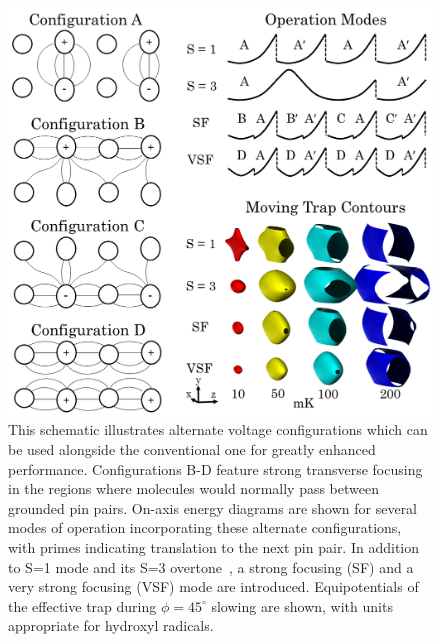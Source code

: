 \documentclass[%
 reprint,
 amsmath,amssymb,
 aps,
prl,
]{revtex4-1}
\newcommand{\SO}{{S=1 }}
\newcommand{\ST}{{S=3 }}
\begin{document}
\begin{figure}[ht!]
\includegraphics[width=\linewidth]{chargecartoon.png}%
\caption{
This schematic illustrates alternate voltage configurations which can be used alongside the conventional one for greatly enhanced performance. Configurations B-D feature strong transverse focusing in the regions where molecules would normally pass between grounded pin pairs. On-axis energy diagrams are shown for several modes of operation incorporating these alternate configurations, with primes indicating translation to the next pin pair. In addition to \SO mode and its \ST overtone~\cite{VanDeMeerakker2005a}, a strong focusing (SF) and a very strong focusing (VSF) mode are introduced. Equipotentials of the effective trap during $\phi=45^\circ$ slowing are shown, with units appropriate for hydroxyl radicals.
}
\label{fig:chargecartoon}
\end{figure}
\end{document}

